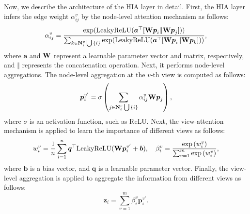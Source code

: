 \documentclass[runningheads]{llncs}
\begin{document}
Now, we describe the architecture of the HIA layer in detail. First, the HIA layer infers the edge weight $\alpha_{ij}^v$ by the node-level attention mechanism as follows:  
\begin{equation}
    \alpha_{ij}^v=\frac{\exp(\mathrm{LeakyReLU}(\boldsymbol{a}^{\top}[\bold{W}\boldsymbol{p}_i\Vert\bold{W}\boldsymbol{p}_j]))}{\sum_{k \in \bold{N}_{i}^v\bigcup{\{i\}}}\exp(\mathrm{LeakyReLU}(\boldsymbol{a}^{\top}[\bold{W}\boldsymbol{p}_i\Vert\bold{W}\boldsymbol{p}_k]))},
\end{equation}
where $\boldsymbol{a}$ and $\bold{W}$ represent a learnable parameter vector and matrix, respectively, and $\Vert$ represents the concatenation operation. 
Next, it performs node-level aggregations.  The node-level aggregation at the $v$-th view is computed as follows:
\begin{equation}
    \boldsymbol{p}^{v'}_{i}=\sigma\left(\sum_{j \in \bold{N}_{i}^v\bigcup{\{i\}}}\alpha_{ij}^v\bold{W}\boldsymbol{p}_j\right),
\end{equation}
where $\sigma$ is an activation function, such as ReLU.
Next,  the view-attention mechanism is applied to learn the importance of different views as follows:
\begin{equation}
    w^v_i = \frac{1}{n}\sum_{i=1}^{n}\boldsymbol{q}^{\top} \mathrm{LeakyReLU}{(\bold{W}\boldsymbol{p}^{v'}_{i} + \boldsymbol{b})}, \quad \beta^v_i = \frac{\exp{(w^v_i)}}{\sum_{v=1}^m\exp{(w^v_i)}},
\end{equation}
where $\boldsymbol{b}$ is a bias vector, and $\boldsymbol{q}$ is a learnable parameter vector. 
Finally, the view-level aggregation is applied to aggregate the information from different views as follows:
\begin{equation}
    \boldsymbol{z}_i = \sum_{v=1}^m \beta^v_i\boldsymbol{p}^{v'}_{i}.
\end{equation}
\end{document}
